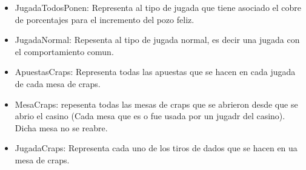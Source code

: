 \begin{itemize}
	\item JugadaTodosPonen: Representa al tipo de jugada que tiene asociado el cobre de porcentajes para el incremento del pozo feliz.

	\item JugadaNormal: Repesenta al tipo de jugada normal, es decir una jugada con el comportamiento comun.

	\item ApuestasCraps: Representa todas las apuestas que se hacen en cada jugada de cada mesa de craps.

	\item MesaCraps: repesenta todas las mesas de craps que se abrieron desde que se abrio el casino (Cada mesa que es o fue usada por un jugadr del casino). Dicha mesa no se reabre.

	\item JugadaCraps: Representa cada uno de los tiros de dados que se hacen en ua mesa de craps.

\end{itemize}
